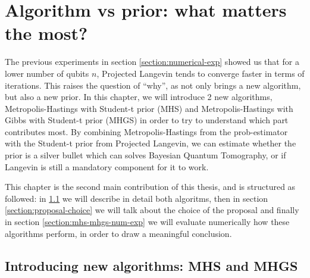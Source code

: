 \documentclass[12pt]{memoir}
\begin{document}
\chapter{Algorithm vs prior: what matters the most?}\label{section:algo-vs-prior}
The previous experiments in section \ref{section:numerical-exp} showed us that for a lower number of qubits $n$, Projected Langevin tends to converge faster in terms of iterations. This raises the question of ``why'', as \cite{meth:bayesian:Langevin:ACMT2024} not only brings a new algorithm, but also a new prior. In this chapter, we will introduce 2 new algorithms, Metropolis-Hastings with Student-t prior (MHS) and Metropolis-Hastings with Gibbs with Student-t prior (MHGS) in order to try to understand which part contributes most. By combining Metropolis-Hastings from the prob-estimator with the Student-t prior from Projected Langevin, we can estimate whether the prior is a silver bullet which can solves Bayesian Quantum Tomography, or if Langevin is still a mandatory component for it to work.\medbreak

This chapter is the second main contribution of this thesis, and is structured as followed: in \ref{section:mhs-and-mhgs} we will describe in detail both algoritms, then in section \ref{section:proposal-choice} we will talk about the choice of the proposal and finally in section \ref{section:mhs-mhgs-num-exp} we will evaluate numerically how these algorithms perform, in order to draw a meaningful conclusion.
\section{Introducing new algorithms: MHS and MHGS}\label{section:mhs-and-mhgs}
\end{document}
